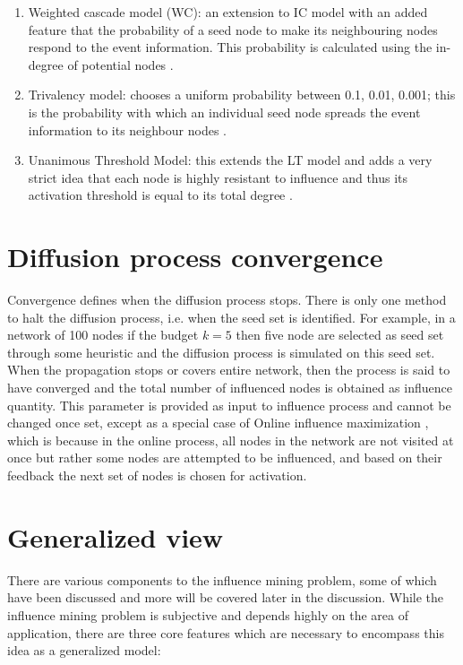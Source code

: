 		\begin{enumerate}
			\item Weighted cascade model (WC): an extension to IC model with an added feature that the probability of a seed node to make its neighbouring nodes respond to the event information. This probability is calculated using the in-degree of potential nodes \cite{kempe2003}.
			
			\item Trivalency model: chooses a uniform probability between 0.1, 0.01, 0.001; this is the probability with which an individual seed node spreads the event information to its neighbour nodes \cite{chen2010}.
			
			\item Unanimous Threshold Model: this extends the LT model and adds a very strict idea that each node is highly resistant to influence and thus its activation threshold is equal to its total degree \cite{chen2009b}.
		\end{enumerate}


	\section{Diffusion process convergence}
	\label{sec:domain-convergence}
	Convergence defines when the diffusion process stops. There is only one method to halt the diffusion process, i.e. when the seed set is identified. For example, in a network of 100 nodes if the budget $k=5$ then five node are selected as seed set through some heuristic and the diffusion process is simulated on this seed set. When the propagation stops or covers entire network, then the process is said to have converged and the total number of influenced nodes is obtained as influence quantity. This parameter is provided as input to influence process and cannot be changed once set, except as a special case of Online influence maximization \cite{lei2015}, which is because in the online process, all nodes in the network are not visited at once but rather some nodes are attempted to be influenced, and based on their feedback the next set of nodes is chosen for activation.
	

	\section{Generalized view}
	\label{sec:domain-generalized-view}
	There are various components to the influence mining problem, some of which have been discussed and more will be covered later in the discussion. While the influence mining problem is subjective and depends highly on the area of application, there are three core features which are necessary to encompass this idea as a generalized model:
	

